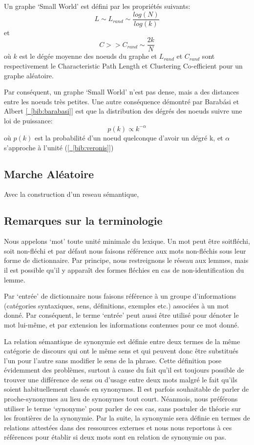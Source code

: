 Un graphe `Small World' est défini par les propriétés suivants:
$$L \sim L_{rand} \sim \frac{log(N)}{log(k)} $$
et
$$C >> C_{rand} \sim \frac{2k}{N} $$
où $k$ est le dégée moyenne des noeuds du graphe et $L_{rand}$ et $C_{rand}$ sont respectivement
le Characteristic Path Length et Clustering Co-efficient pour un graphe aléatoire.

Par conséquent, un graphe `Small World' n'est pas dense, mais a des distances entre les noeuds
très petites. Une autre conséquence démontré par Barabási et Albert
\hyperref[bib:barabasi]{[~\ref*{bib:barabasi}]} est que la distribution des dégrés
des noeuds suivre une loi de puissance:
$$ p(k) \propto k^{-\alpha}$$
où $p(k)$ est la probabilité d'un noeud quelconque d'avoir un dégré k, et
$\alpha$ s'approche à l'unité (\hyperref[bib:veronis]{[~\ref*{bib:veronis}]})


\subsection{ Marche Aléatoire }

Avec la construction d'un reseau sémantique, 

\subsection{Remarques sur la terminologie}
Nous appelons `mot' toute unité minimale du lexique. Un mot peut être
soitfléchi, soit non-fléchi et par défaut nous faisons référence aux mots 
non-fléchis sous leur forme de dictionnaire. Par principe, nous restreignons le 
réseau aux lemmes, mais il est possible qu'il y apparaît des formes fléchies en 
cas de non-identification du lemme.

Par `entrée' de dictionnaire nous faisons référence à un groupe d'informations 
(catégories syntaxiques, sens, définitions, exemples etc.) associées à un mot 
donné. Par conséquent, le terme `entrée' peut aussi être utilisé pour dénoter 
le mot lui-même, et par extension les informations contenues pour ce mot donné.

La relation sémantique de synonymie est définie entre deux termes de la même 
catégorie de discours qui ont le même sens et qui peuvent donc être substitués 
l'un pour l'autre sans modifier le sens de la phrase. Cette définition pose 
évidemment des problèmes, surtout à cause du fait qu'il est toujours possible 
de trouver une différence de sens ou d'usage entre deux mots malgré le fait 
qu'ils soient habituellement classés en synonymes. Il est parfois souhaitable 
de parler de proche-synonymes au lieu de synonymes tout court. Néanmois, 
nous préférons utiliser le terme `synonyme' pour parler de ces cas, sans 
postuler de théorie sur les frontières de la synonymie. Par la suite, la 
synonymie sera définie en termes de relations attestées dans des ressources 
externes et nous nous reportons à ces références pour établir si deux mots sont 
en relation de synonymie ou pas.

